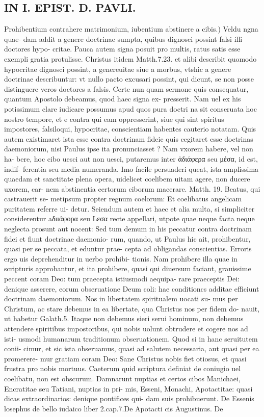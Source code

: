 \documentclass{article}
\begin{document}
\begin{pages}
\section*{IN I. EPIST. D. PAVLI. }
\marginpar{[ p.92 ]}\pstart Prohibentium contrahere matrimonium, iubentium abstinere a cibis.) Veldu ngna quae- dam addit a genere doctrinae sumpta, quibus dignosci possint falsi illi doctores hypo- critae. Pauca autem signa posuit pro multis, ratus satis esse exempli gratia protulisse. Christus itidem Matth.7.23. et alibi describit quomodo hypocritae dignosci possint, a genereuitae siue a morbus, vtshic a genere doctrinae describuntur: vt nullo pacto excusari possint, qui dicunt, se non posse distinguere veros doctores a falsis. Certe nun quam sermone quis consequatur, quantum Apostolo debeamus, quod haec signa ex- presserit. Nam uel ex his potissimum clare iudicare possumus apud quos pura doctri na sit conseruata hoc nostro tempore, et e contra qui eam oppresserint, siue qui sint spiritus impostores, falsiloqui, hypocritae, conscientiam habentes cauterio notatam. Quis autem existimaret ista esse contra doctrinam fideic quis cegitaret esse doctrinas daemoniorum, nisi Paulus ipse ita pronunciasset ? Nam vxorem habere, vel non ha- bere, hoc cibo uesci aut non uesci, putaremus inter ἀδιάφερα seu μέσα, id est, indif- ferentia seu media numeranda. Imo facile persuaderi queat, ista amplissima quaedam et sanctitate plena opera, uidelicet coelibem uitam agere, non ducere uxorem, car- nem abstinentia certorum ciborum macerare. Matth. 19. Beatus, qui castrauerit se- metipsum propter regnum coelorum: Et coelibatus angelicam puritatem referre ui- detur. Seiendum autem et haec et alia multa, si simpliciter considerentur aδιιάφορα seu Lεσα recte appellari, utpote quae neque facta neque neglecta prosunt aut nocent: Sed tum demum in his peccatur contra doctrinam fidei et fiunt doctrinae daemonio- rum, quando, ut Paulus hic ait, prohibentur, quasi per se peccata, et eduntur prae- cepta ad obligandas conscientias. Erroris ergo uis deprehenditur in uerbo prohibi- tionis. Nam prohibere illa quae in scripturis approbantur, et ita prohibere, quasi qui diuersum faciant, grauissime peccent coram Deo: tum praecepta istiusmodi aequipa- rare praeceptis Dei: denique asserere, eorum obseruatione Deum coli: hae conditioncs additae efficiunt doctrinam daemoniorum. Nos in libertatem spiritualem uocati su- mus per Christum, ac stare debemus in ea libertate, qua Christus nos per fidem do- nauit, ut habetur Galath.5. Itaque non debemus sieri serui hominum, non debemus attendere spiritibus impostoribus, qui nobis uolunt obtrudere et cogere nos ad isti- usmodi humanarum traditionum obseruationem. Quod si in hanc seruitutem conii- cimur, et sic ista obseruamus, quasi ad salutem necessaria, aut quasi per ea promerere- mur gratiam coram Deo: Sane Christus nobis fiet otiosus, et quasi frustra pro nobis mortuus. Caeterum quid scriptura definiat de coniugio uel coelibatu, non est obscurum. Damnarunt nuptias et certos cibos Manichaei, Encratitae seu Tatiani, nuptias in pri- mis, Esseni, Monachi, Apotactitae: quasi dicas extraordinarios: denique pontifices qui- dam suis prohibuerunt. De Essenis losephus de bello iudaico liber 2.cap.7.De Apotacti cis Augustinus. De 
\end{pages}
\end{document}
